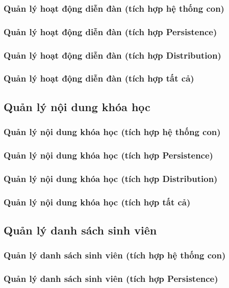 \documentclass[./../main.tex]{subfiles}
\begin{document}
\subsubsection{Quản lý hoạt động diễn đàn (tích hợp hệ thống con)}
\subsubsection{Quản lý hoạt động diễn đàn (tích hợp Persistence)}
\subsubsection{Quản lý hoạt động diễn đàn (tích hợp Distribution)}
\subsubsection{Quản lý hoạt động diễn đàn (tích hợp tất cả)}

\subsection{Quản lý nội dung khóa học}
\subsubsection{Quản lý nội dung khóa học (tích hợp hệ thống con)}
\subsubsection{Quản lý nội dung khóa học (tích hợp Persistence)}
\subsubsection{Quản lý nội dung khóa học (tích hợp Distribution)}
\subsubsection{Quản lý nội dung khóa học (tích hợp tất cả)}

\subsection{Quản lý danh sách sinh viên}
\subsubsection{Quản lý danh sách sinh viên (tích hợp hệ thống con)}
\subsubsection{Quản lý danh sách sinh viên (tích hợp Persistence)}
\end{document}
